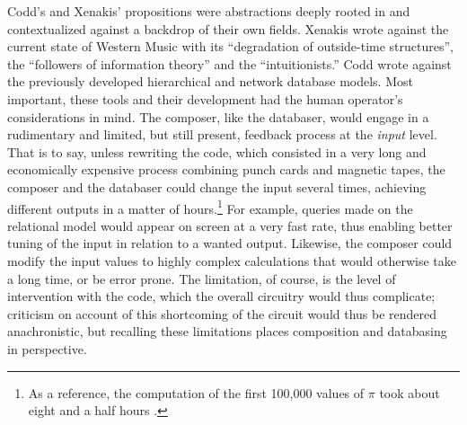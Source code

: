 Codd's and Xenakis' propositions were abstractions deeply rooted in and contextualized against a backdrop of their own fields. Xenakis wrote against the current state of Western Music with its ``degradation of outside-time structures'', the ``followers of information theory'' and the ``intuitionists.'' Codd wrote against the previously developed hierarchical and network database models. Most important, these tools and their development had the human operator's considerations in mind. The composer, like the databaser, would engage in a rudimentary and limited, but still present, feedback process at the \textit{input} level. That is to say, unless rewriting the code, which consisted in a very long and economically expensive process combining punch cards and magnetic tapes, the composer and the databaser could change the input several times, achieving different outputs in a matter of hours.\footnote{As a reference, the computation of the first 100,000 values of $\pi$ took about eight and a half hours \parencite{picalc}.} For example, queries made on the relational model would appear on screen at a very fast rate, thus enabling better tuning of the input in relation to a wanted output. Likewise, the composer could modify the input values to highly complex calculations that would otherwise take a long time, or be error prone. The limitation, of course, is the level of intervention with the code, which the overall circuitry would thus complicate; criticism on account of this shortcoming of the circuit would thus be rendered anachronistic, but recalling these limitations places composition and databasing in perspective.

